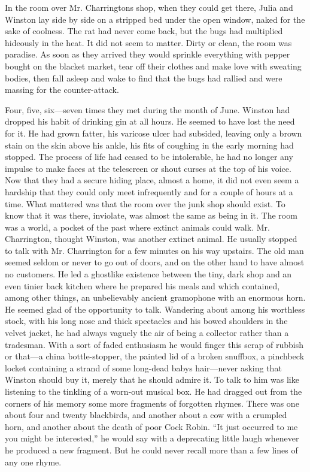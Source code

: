 In the room over Mr. Charrington\textquotesingle s shop, when they could
get there, Julia and Winston lay side by side on a stripped bed under
the open window, naked for the sake of coolness. The rat had never come
back, but the bugs had multiplied hideously in the heat. It did not seem
to matter. Dirty or clean, the room was paradise. As soon as they
arrived they would sprinkle everything with pepper bought on the blacket
market, tear off their clothes and make love with sweating bodies, then
fall asleep and wake to find that the bugs had rallied and were massing
for the counter-attack.

Four, five, six---seven times they met during the month of June. Winston
had dropped his habit of drinking gin at all hours. He seemed to have
lost the need for it. He had grown fatter, his varicose ulcer had
subsided, leaving only a brown stain on the skin above his ankle, his
fits of coughing in the early morning had stopped. The process of life
had ceased to be intolerable, he had no longer any impulse to make faces
at the telescreen or shout curses at the top of his voice. Now that they
had a secure hiding place, almost a home, it did not even seem a
hardship that they could only meet infrequently and for a couple of
hours at a time. What mattered was that the room over the junk shop
should exist. To know that it was there, inviolate, was almost the same
as being in it. The room was a world, a pocket of the past where extinct
animals could walk. Mr. Charrington, thought Winston, was another
extinct animal. He usually stopped to talk with Mr. Charrington for a
few minutes on his way upstairs. The old man seemed seldom or never to
go out of doors, and on the other hand to have almost no customers. He
led a ghostlike existence between the tiny, dark shop and an even tinier
back kitchen where he prepared his meals and which contained, among
other things, an unbelievably ancient gramophone with an enormous horn.
He seemed glad of the opportunity to talk. Wandering about among his
worthless stock, with his long nose and thick spectacles and his bowed
shoulders in the velvet jacket, he had always vaguely the air of being a
collector rather than a tradesman. With a sort of faded enthusiasm he
would finger this scrap of rubbish or that---a china bottle-stopper, the
painted lid of a broken snuffbox, a pinchbeck locket containing a strand
of some long-dead baby\textquotesingle s hair---never asking that
Winston should buy it, merely that he should admire it. To talk to him
was like listening to the tinkling of a worn-out musical box. He had
dragged out from the corners of his memory some more fragments of
forgotten rhymes. There was one about four and twenty blackbirds, and
another about a cow with a crumpled horn, and another about the death of
poor Cock Robin. ``It just occurred to me you might be interested,'' he
would say with a deprecating little laugh whenever he produced a new
fragment. But he could never recall more than a few lines of any one
rhyme.

